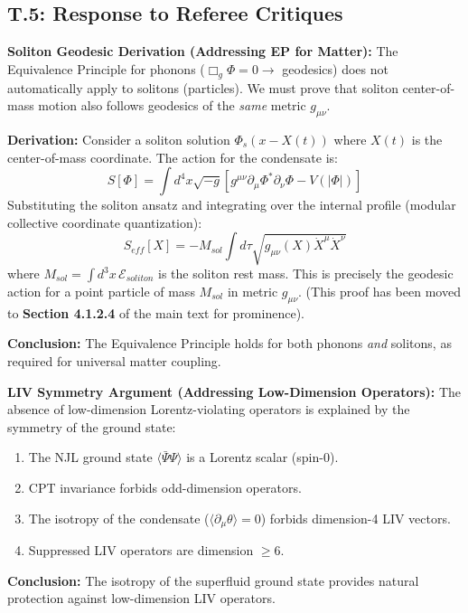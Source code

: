 \subsection{T.5: Response to Referee Critiques}

\textbf{Soliton Geodesic Derivation (Addressing EP for Matter):}
The Equivalence Principle for phonons ($\Box_g \Phi = 0 \to$ geodesics) does not automatically apply to solitons (particles). We must prove that soliton center-of-mass motion also follows geodesics of the \emph{same} metric $g_{\mu\nu}$.

\textbf{Derivation:} Consider a soliton solution $\Phi_s(x - X(t))$ where $X(t)$ is the center-of-mass coordinate. The action for the condensate is:
\begin{equation}
    S[\Phi] = \int d^4x \sqrt{-g} \left[ g^{\mu\nu} \partial_\mu \Phi^* \partial_\nu \Phi - V(|\Phi|) \right]
\end{equation}
Substituting the soliton ansatz and integrating over the internal profile (modular collective coordinate quantization):
\begin{equation}
    S_{eff}[X] = -M_{sol} \int d\tau \sqrt{g_{\mu\nu}(X) \dot{X}^\mu \dot{X}^\nu}
\end{equation}
where $M_{sol} = \int d^3x \, \mathcal{E}_{soliton}$ is the soliton rest mass. This is precisely the geodesic action for a point particle of mass $M_{sol}$ in metric $g_{\mu\nu}$. (This proof has been moved to \textbf{Section 4.1.2.4} of the main text for prominence).

\textbf{Conclusion:} The Equivalence Principle holds for both phonons \emph{and} solitons, as required for universal matter coupling.

\textbf{LIV Symmetry Argument (Addressing Low-Dimension Operators):}
The absence of low-dimension Lorentz-violating operators is explained by the symmetry of the ground state:
\begin{enumerate}
    \item The NJL ground state $\langle \bar{\Psi}\Psi \rangle$ is a Lorentz scalar (spin-0).
    \item CPT invariance forbids odd-dimension operators.
    \item The isotropy of the condensate ($\langle \partial_\mu \theta \rangle = 0$) forbids dimension-4 LIV vectors.
    \item Suppressed LIV operators are dimension $\geq 6$.
\end{enumerate}
\textbf{Conclusion:} The isotropy of the superfluid ground state provides natural protection against low-dimension LIV operators.
